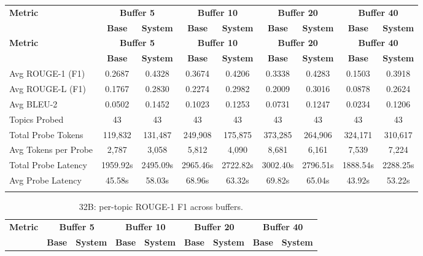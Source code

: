\begin{landscape}
\begin{longtable}{@{}p{3.8cm}cccccccc@{}}
\toprule
\textbf{Metric} & \multicolumn{2}{c}{\textbf{Buffer 5}} & \multicolumn{2}{c}{\textbf{Buffer 10}} & \multicolumn{2}{c}{\textbf{Buffer 20}} & \multicolumn{2}{c}{\textbf{Buffer 40}} \\
\cmidrule(lr){2-3}\cmidrule(lr){4-5}\cmidrule(lr){6-7}\cmidrule(lr){8-9}
 & \textbf{Base} & \textbf{System} & \textbf{Base} & \textbf{System} & \textbf{Base} & \textbf{System} & \textbf{Base} & \textbf{System} \\
\midrule
\endfirsthead

\toprule
\textbf{Metric} & \multicolumn{2}{c}{\textbf{Buffer 5}} & \multicolumn{2}{c}{\textbf{Buffer 10}} & \multicolumn{2}{c}{\textbf{Buffer 20}} & \multicolumn{2}{c}{\textbf{Buffer 40}} \\
\cmidrule(lr){2-3}\cmidrule(lr){4-5}\cmidrule(lr){6-7}\cmidrule(lr){8-9}
 & \textbf{Base} & \textbf{System} & \textbf{Base} & \textbf{System} & \textbf{Base} & \textbf{System} & \textbf{Base} & \textbf{System} \\
\midrule
\endhead
Avg ROUGE-1 (F1) & 0.2687 & 0.4328 & 0.3674 & 0.4206 & 0.3338 & 0.4283 & 0.1503 & 0.3918 \\
Avg ROUGE-L (F1) & 0.1767 & 0.2830 & 0.2274 & 0.2982 & 0.2009 & 0.3016 & 0.0878 & 0.2624 \\
Avg BLEU-2 & 0.0502 & 0.1452 & 0.1023 & 0.1253 & 0.0731 & 0.1247 & 0.0234 & 0.1206 \\
Topics Probed & 43 & 43 & 43 & 43 & 43 & 43 & 43 & 43 \\
Total Probe Tokens & 119,832 & 131,487 & 249,908 & 175,875 & 373,285 & 264,906 & 324,171 & 310,617 \\
Avg Tokens per Probe & 2,787 & 3,058 & 5,812 & 4,090 & 8,681 & 6,161 & 7,539 & 7,224 \\
Total Probe Latency & 1959.92s & 2495.09s & 2965.46s & 2722.82s & 3002.40s & 2796.51s & 1888.54s & 2288.25s \\
Avg Probe Latency & 45.58s & 58.03s & 68.96s & 63.32s & 69.82s & 65.04s & 43.92s & 53.22s \\
\botrule
\end{longtable}
\begin{longtable}{@{}p{3.8cm}cccccccc@{}}
\caption{32B: per-topic ROUGE-1 F1 across buffers.}\label{tab:app_32b_rouge1_topics}\\

\toprule
\textbf{Metric} & \multicolumn{2}{c}{\textbf{Buffer 5}} & \multicolumn{2}{c}{\textbf{Buffer 10}} & \multicolumn{2}{c}{\textbf{Buffer 20}} & \multicolumn{2}{c}{\textbf{Buffer 40}} \\
\cmidrule(lr){2-3}\cmidrule(lr){4-5}\cmidrule(lr){6-7}\cmidrule(lr){8-9}
 & \textbf{Base} & \textbf{System} & \textbf{Base} & \textbf{System} & \textbf{Base} & \textbf{System} & \textbf{Base} & \textbf{System} \\
\midrule
\endfirsthead


\end{longtable}
\end{landscape}

